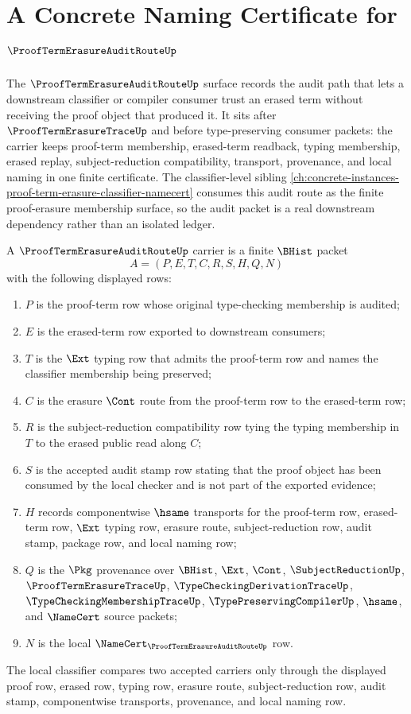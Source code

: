 \chapter{A Concrete Naming Certificate for $\ProofTermErasureAuditRouteUp$}
\label{ch:concrete-instances-proofterm-erasure-audit-route-namecert}

The $\ProofTermErasureAuditRouteUp$ surface records the audit path that lets a downstream classifier or compiler consumer trust an erased term without receiving the proof object that produced it. It sits after $\ProofTermErasureTraceUp$ and before type-preserving consumer packets: the carrier keeps proof-term membership, erased-term readback, typing membership, erased replay, subject-reduction compatibility, transport, provenance, and local naming in one finite certificate. The classifier-level sibling \autoref{ch:concrete-instances-proof-term-erasure-classifier-namecert} consumes this audit route as the finite proof-erasure membership surface, so the audit packet is a real downstream dependency rather than an isolated ledger.

\begin{definition}
\label{def:proofterm-erasure-audit-route-carrier}
A $\ProofTermErasureAuditRouteUp$ carrier is a finite $\BHist$ packet
$$
A=(P,E,T,C,R,S,H,Q,N)
$$
with the following displayed rows:
\begin{enumerate}
\item $P$ is the proof-term row whose original type-checking membership is audited;
\item $E$ is the erased-term row exported to downstream consumers;
\item $T$ is the $\Ext$ typing row that admits the proof-term row and names the classifier membership being preserved;
\item $C$ is the erasure $\Cont$ route from the proof-term row to the erased-term row;
\item $R$ is the subject-reduction compatibility row tying the typing membership in $T$ to the erased public read along $C$;
\item $S$ is the accepted audit stamp row stating that the proof object has been consumed by the local checker and is not part of the exported evidence;
\item $H$ records componentwise $\hsame$ transports for the proof-term row, erased-term row, $\Ext$ typing row, erasure route, subject-reduction row, audit stamp, package row, and local naming row;
\item $Q$ is the $\Pkg$ provenance over $\BHist$, $\Ext$, $\Cont$, $\SubjectReductionUp$, $\ProofTermErasureTraceUp$, $\TypeCheckingDerivationTraceUp$, $\TypeCheckingMembershipTraceUp$, $\TypePreservingCompilerUp$, $\hsame$, and $\NameCert$ source packets;
\item $N$ is the local $\NameCert_{\ProofTermErasureAuditRouteUp}$ row.
\end{enumerate}
The local classifier compares two accepted carriers only through the displayed proof row, erased row, typing row, erasure route, subject-reduction row, audit stamp, componentwise transports, provenance, and local naming row.
\end{definition}

